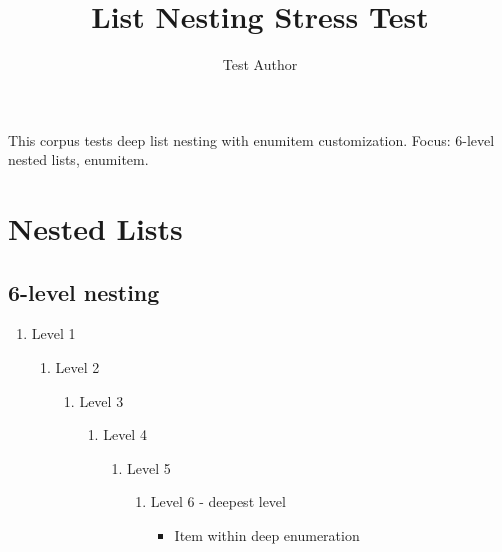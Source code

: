 \documentclass{article}
\title{List Nesting Stress Test}
\author{Test Author}
\begin{document}
\maketitle

\begin{abstrct}
This corpus tests deep list nesting with enumitem customization.
Focus: 6-level nested lists, enumitem.
\end{abstrct}

\section{Nested Lists}

\subsection{6-level nesting}

\begin{enumerate}
  \item Level 1
        \begin{enumerate}
          \item Level 2
                \begin{enumerate}
                  \item Level 3
                        \begin{enumerate}
                          \item Level 4
                                \begin{enumerate}
                                  \item Level 5
                                        \begin{enumerate}
                                          \item Level 6 - deepest level
                                                  \begin{itemize}
                                            \item Item within deep enumeration
                                          \end{itemize}
                                        \end{enumerate}
                                \end{enumerate}
                        \end{enumerate}
                \end{enumerate}
        \end{enumerate}
\end{enumerate}
\end{document}
